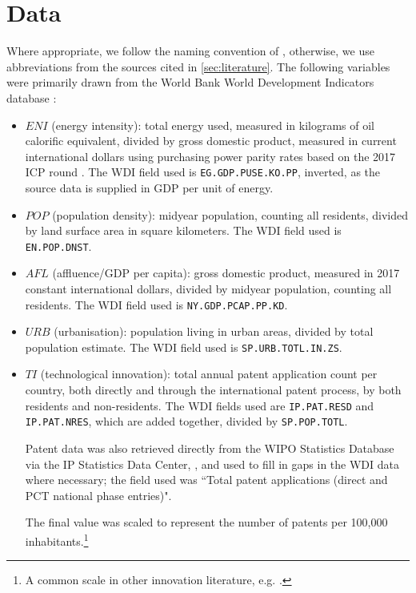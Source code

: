\documentclass[12pt,a4paper]{article}
\begin{document}
\section{Data}\label{sec:data}
Where appropriate, we follow the naming convention of \cite{rafiqUrbanizationOpennessEmissions2016}, otherwise, we use abbreviations from the sources cited in \cref{sec:literature}.
The following variables were primarily drawn from the World Bank World Development Indicators database \citep{theworldbankWorldDevelopmentIndicators2020}:
\begin{itemize}
\item $ENI$ (energy intensity): total energy used, measured in kilograms of oil calorific equivalent, divided by gross domestic product, measured in current international dollars using purchasing power parity rates based on the 2017 ICP round \citep{theworldbankPurchasingPowerParities2020}.
The WDI field used is \texttt{EG.GDP.PUSE.KO.PP}, inverted, as the source data is supplied in GDP per unit of energy.
\item $POP$ (population density): midyear population, counting all residents, divided by land surface area in square kilometers. The WDI field used is \texttt{EN.POP.DNST}.
\item $AFL$ (affluence/GDP per capita): gross domestic product, measured in 2017 constant international dollars, divided by midyear population, counting all residents. The WDI field used is \texttt{NY.GDP.PCAP.PP.KD}.
\item $URB$ (urbanisation): population living in urban areas, divided by total population estimate. The WDI field used is \texttt{SP.URB.TOTL.IN.ZS}.
\item $TI$ (technological innovation): total annual patent application count per country, both directly and through the international patent process, by both residents and non-residents. The WDI fields used are \texttt{IP.PAT.RESD} and \texttt{IP.PAT.NRES}, which are added together, divided by \texttt{SP.POP.TOTL}.

Patent data was also retrieved directly from the WIPO Statistics Database via the IP Statistics Data Center, \cite{wipoWIPOStatisticsDatabase2020}, and used to fill in gaps in the WDI data where necessary; the field used was ``Total patent applications (direct and PCT national phase entries)".

The final value was scaled to represent the number of patents per 100,000 inhabitants.\footnote{A common scale in other innovation literature, e.g. \cite{ocampo-corralesKnowledgeFlowsTechnologies2020}.}
 
\end{itemize}
\end{document}
